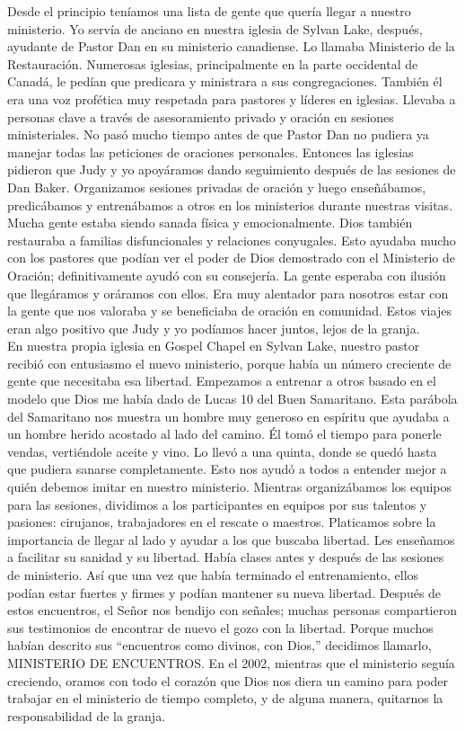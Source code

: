 \documentclass[twoside, 12pt]{book}
\begin{document}
Desde el principio teníamos una lista de gente que quería llegar a nuestro ministerio. Yo servía de anciano en nuestra iglesia de Sylvan Lake, después, ayudante de Pastor Dan en su ministerio canadiense. Lo llamaba Ministerio de la Restauración. Numerosas iglesias, principalmente en la parte occidental de Canadá, le pedían que predicara y ministrara a sus congregaciones. También él era una voz profética muy respetada para pastores y líderes en iglesias. Llevaba a personas clave a través de asesoramiento privado y oración en sesiones ministeriales. No pasó mucho tiempo antes de que Pastor Dan no pudiera ya manejar todas las peticiones de oraciones personales.  Entonces las iglesias pidieron que Judy y yo apoyáramos dando seguimiento después de las sesiones de Dan Baker. Organizamos sesiones privadas de oración y luego enseñábamos, predicábamos y entrenábamos a otros en los ministerios durante nuestras visitas. Mucha gente estaba siendo sanada física y emocionalmente. Dios también restauraba a familias disfuncionales y relaciones conyugales. Esto ayudaba mucho con los pastores que podían ver el poder de Dios demostrado con el Ministerio de Oración; definitivamente ayudó con su consejería. La gente esperaba con ilusión que llegáramos y oráramos con ellos.  Era muy alentador para nosotros estar con la gente que nos valoraba y se beneficiaba de oración en comunidad. Estos viajes eran algo positivo que Judy y yo podíamos hacer juntos, lejos de la granja.\\

En nuestra propia iglesia en Gospel Chapel en Sylvan Lake, nuestro pastor recibió con entusiasmo el nuevo ministerio, porque había un número creciente de gente que necesitaba esa libertad. Empezamos a entrenar a otros basado en el modelo que Dios me había dado de Lucas 10 del Buen Samaritano. Esta parábola del Samaritano nos muestra un hombre muy generoso en espíritu que ayudaba a un hombre herido acostado al lado del camino. Él tomó el tiempo para ponerle vendas, vertiéndole aceite y vino.  Lo llevó a una quinta, donde se quedó hasta que pudiera sanarse completamente. Esto nos ayudó a todos a entender mejor a quién debemos imitar en nuestro ministerio. Mientras organizábamos los equipos para las sesiones, dividimos a los participantes en equipos por sus talentos y pasiones: cirujanos, trabajadores en el rescate o maestros. Platicamos sobre la importancia de llegar al lado y ayudar a los que buscaba libertad. Les enseñamos a facilitar su sanidad y su libertad. Había clases antes y después de las sesiones de ministerio. Así que una vez que había terminado el entrenamiento, ellos podían estar fuertes y firmes y podían mantener su nueva libertad.  Después de estos encuentros, el Señor nos bendijo con señales; muchas personas compartieron sus testimonios de encontrar de nuevo el gozo con la libertad.  Porque muchos habían descrito sus “encuentros como divinos, con Dios,” decidimos llamarlo, MINISTERIO DE ENCUENTROS.  En el 2002, mientras que el ministerio seguía creciendo, oramos con todo el corazón que Dios nos diera un camino para poder trabajar en el ministerio de tiempo completo, y de alguna manera, quitarnos la responsabilidad de la granja.\\
\end{document}
